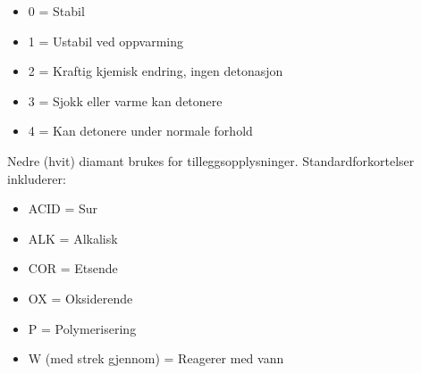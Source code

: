 \begin{itemize}
\item{} 0 = Stabil
\item{} 1 = Ustabil ved oppvarming
\item{} 2 = Kraftig kjemisk endring, ingen detonasjon
\item{} 3 = Sjokk eller varme kan detonere
\item{} 4 = Kan detonere under normale forhold
\end{itemize}

\vskip 10pt

Nedre (hvit) diamant brukes for tilleggsopplysninger. Standardforkortelser inkluderer:

\begin{itemize}
\item{} ACID = Sur
\item{} ALK = Alkalisk
\item{} COR = Etsende
\item{} OX = Oksiderende
\item{} P = Polymerisering
\item{} W (med strek gjennom) = Reagerer med vann
\end{itemize}



